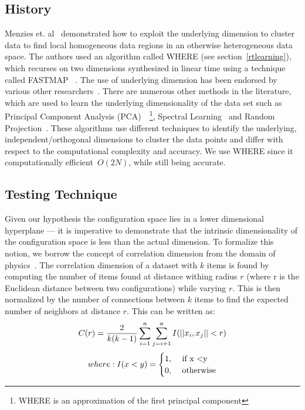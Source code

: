 \subsection{History}
Menzies et. al~\cite{me12d}  demonstrated how to exploit the underlying dimension to cluster data to find local homogeneous data regions in an otherwise heterogeneous data space. The authors used an algorithm called WHERE (see section~\ref{rtlearning}), which recurses on two dimensions synthesized in linear time using a technique called FASTMAP ~\cite{faloutsos1995fastmap}. The use of underlying dimension has been endorsed by various other researchers~\cite{bettenburg2012think, deiters2013using, bettenburg2015towards, zhang2016cross}. There are numerous other methods in the literature, which are used to learn the underlying dimensionality of the data set such as Principal Component Analysis (PCA)~\cite{jolliffe2002principal}~\footnote{WHERE is an approximation of the first principal component}, Spectral Learning~\cite{shi2000normalized} and Random Projection~\cite{bingham2001random}.  These algorithms  use  different techniques to identify the underlying, independent/orthogonal dimensions to cluster the data points and differ with respect to the computational complexity and accuracy. We use WHERE since it computationally efficient~$O(2N)$, while still being accurate.



\subsection{Testing Technique}
Given our hypothesis the configuration space lies in a lower dimensional hyperplane ---  it is imperative to demonstrate that the intrinsic dimensionality of the configuration space is less than the actual dimension. To formalize this notion, we borrow the concept of correlation dimension from the domain of physics~\cite{grassberger2004measuring}. The correlation dimension of a dataset with $k$ items is found by computing the number of items found at distance withing radius $r$ (where r is the Euclidean distance between two configurations) while varying $r$. This is then normalized by the number of connections between $k$ items to find the expected number of neighbors at distance $r$. This can be written as:
\begin{equation}
    C(r) = \frac{2}{k(k-1)} \displaystyle\sum_{i=1}^{n} \displaystyle\sum_{j=i+1}^{n} I(||x_i, x_j|| < r) \\  
 \end{equation} 
$$
where:
    I(x < y) = \begin{cases}
            1, & \text{ if x \textless y}\\
            0, & \text{ otherwise}\\
    \end{cases}
$$
  


